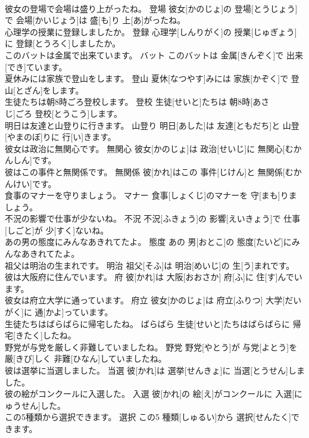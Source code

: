 \documentclass[8pt]{extreport}
\begin{document}
\begin{CJK}{UTF8}{min}
\\	彼女の登場で会場は盛り上がったね。	登場	彼女[かのじょ]の 登場[とうじょう]で 会場[かいじょう]は 盛[も]り 上[あ]がったね。	
\\	心理学の授業に登録しましたか。	登録	心理学[しんりがく]の 授業[じゅぎょう]に 登録[とうろく]しましたか。	
\\	このバットは金属で出来ています。	バット	このバットは 金属[きんぞく]で 出来[でき]ています。	
\\	夏休みには家族で登山をします。	登山	夏休[なつやす]みには 家族[かぞく]で 登山[とざん]をします。	
\\	生徒たちは朝8時ごろ登校します。	登校	生徒[せいと]たちは 朝8時[あさ 
\\	じ]ごろ 登校[とうこう]します。	
\\	明日は友達と山登りに行きます。	山登り	明日[あした]は 友達[ともだち]と 山登[やまのぼ]りに 行[い]きます。	
\\	彼女は政治に無関心です。	無関心	彼女[かのじょ]は 政治[せいじ]に 無関心[むかんしん]です。	
\\	彼はこの事件と無関係です。	無関係	彼[かれ]はこの 事件[じけん]と 無関係[むかんけい]です。	
\\	食事のマナーを守りましょう。	マナー	食事[しょくじ]のマナーを 守[まも]りましょう。	
\\	不況の影響で仕事が少ないね。	不況	不況[ふきょう]の 影響[えいきょう]で 仕事[しごと]が 少[すく]ないね。	
\\	あの男の態度にみんなあきれてたよ。	態度	あの 男[おとこ]の 態度[たいど]にみんなあきれてたよ。	
\\	祖父は明治の生まれです。	明治	祖父[そふ]は 明治[めいじ]の 生[う]まれです。	
\\	彼は大阪府に住んでいます。	府	彼[かれ]は 大阪[おおさか] 府[ふ]に 住[す]んでいます。	
\\	彼女は府立大学に通っています。	府立	彼女[かのじょ]は 府立[ふりつ] 大学[だいがく]に 通[かよ]っています。	
\\	生徒たちはばらばらに帰宅したね。	ばらばら	生徒[せいと]たちはばらばらに 帰宅[きたく]したね。	
\\	野党が与党を厳しく非難していましたね。	野党	野党[やとう]が 与党[よとう]を 厳[きび]しく 非難[ひなん]していましたね。	
\\	彼は選挙に当選しました。	当選	彼[かれ]は 選挙[せんきょ]に 当選[とうせん]しました。	
\\	彼の絵がコンクールに入選した。	入選	彼[かれ]の 絵[え]がコンクールに 入選[にゅうせん]した。	
\\	この5種類から選択できます。	選択	この5 種類[しゅるい]から 選択[せんたく]できます。	

\end{CJK}
\end{document}

